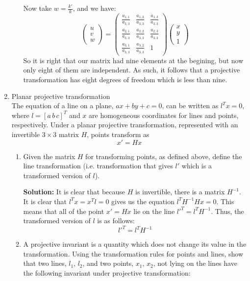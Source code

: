 \documentclass[12pt]{article}
\begin{document}
\begin{enumerate}[leftmargin=\labelsep]
\begin{enumerate}
\begin{equation}
        \end{equation}
        Now take $w = \frac{k'}{k}$, and we have:
        \begin{equation}
        \begin{pmatrix}
        u \\
        v \\
        w
        \end{pmatrix} = \begin{pmatrix}
        \frac{a_{1,1}}{a_{3,3}} & \frac{a_{1,2}}{a_{3,3}} & \frac{a_{1,3}}{a_{3,3}} \\
        \frac{a_{2,1}}{a_{3,3}} & \frac{a_{2,2}}{a_{3,3}} & \frac{a_{2,3}}{a_{3,3}} \\
        \frac{a_{3,1}}{a_{3,3}} & \frac{a_{3,2}}{a_{3,3}} & 1
        \end{pmatrix}\begin{pmatrix}
        x \\
        y \\
        1
        \end{pmatrix}
        \end{equation}
        So it is right that our matrix had nine elements at the begining, but now only eight of them are independent. As such, it follows that a projective transformation has eight degrees of freedom which is less than nine.
\end{enumerate}
\item Planar projective transformation\\
The equation of a line on a plane, $ax + by + c = 0$, can be written as $l^Tx= 0$, where
$l = [a\,b\,c]^T$
and $x$ are homogeneous coordinates for lines and points, respectively. Under a planar projective transformation, represented with an invertible $3\times3$ matrix $H$, points transform as
$$x' = Hx$$
    \begin{enumerate}
        \item Given the matrix $H$ for transforming points, as defined above, define the line transformation (i.e. transformation that gives $l'$ which is a transformed version of $l$).
        
        \textbf{Solution:} It is clear that because $H$ is invertible, there is a matrix $H^{-1}$. It is clear that $l^Tx = x^Tl=0$ gives us the equation $l^TH^{-1}Hx = 0$. This means that all of the point $x'= Hx$ lie on the line $l'^T=l^TH^{-1}$. Thus, the transformed version of $l$ is as follows:
        $$l'^T = l^TH^{-1}$$
        \item A projective invariant is a quantity which does not change its value in the transformation. Using the transformation rules for points and lines, show that two lines, $l_1$, $l_2$, and
two points, $x_1$, $x_2$, not lying on the lines have the following invariant under projective
transformation: 


\end{enumerate}
\end{enumerate}
\end{document}
